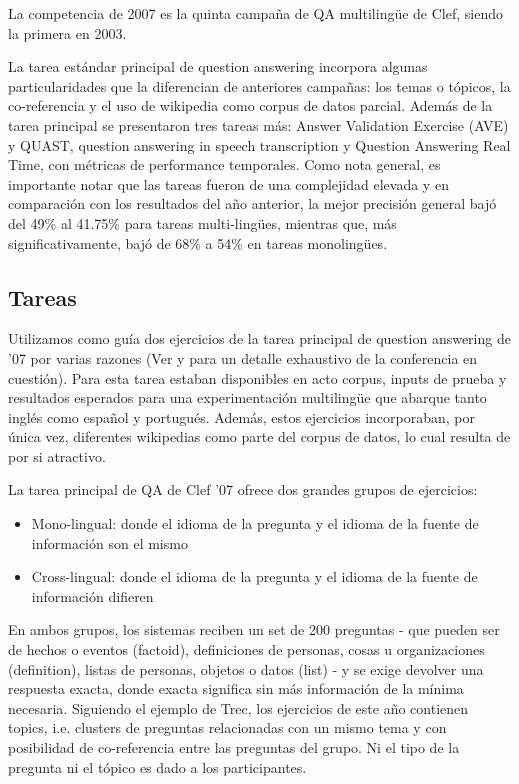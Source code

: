 La competencia de 2007 es la quinta campaña de QA multilingüe de Clef, siendo la primera en 2003.

La tarea estándar principal de question answering incorpora algunas particularidades que la diferencian de anteriores campañas: los temas o tópicos, la co-referencia y el uso de wikipedia como corpus de datos parcial. Además de la tarea principal se presentaron tres tareas más: Answer Validation Exercise (AVE) y QUAST, question answering in speech transcription y Question Answering Real Time, con métricas de performance temporales. Como nota general, es importante notar que las tareas fueron de una complejidad elevada y en comparación con los resultados del año anterior, la mejor precisión general bajó del 49\% al 41.75\% para tareas multi-lingües, mientras que, más significativamente, bajó de 68\% a 54\% en tareas monolingües.


\subsection{Tareas}
\label{subsec:tareas}
Utilizamos como guía dos ejercicios de la tarea principal de question answering de '07  por varias razones (Ver \cite{GuidelineClef07} y \cite{OverviewClef07} para un detalle exhaustivo de la conferencia en cuestión). Para esta tarea estaban disponibles en acto corpus, inputs de prueba y resultados esperados para una experimentación multilingüe que abarque tanto inglés como español y portugués. Además, estos ejercicios incorporaban, por única vez, diferentes wikipedias como parte del corpus de datos, lo cual resulta de por si atractivo.

La tarea principal de QA de Clef '07 ofrece dos grandes grupos de ejercicios:
\begin{itemize}
\item Mono-lingual: donde el idioma de la pregunta y el idioma de la fuente de información son el mismo
\item Cross-lingual: donde el idioma de la pregunta y el idioma de la fuente de información difieren
\end{itemize}

En ambos grupos, los sistemas reciben un set de 200 preguntas - que pueden ser de hechos o eventos (factoid), definiciones de personas, cosas u organizaciones (definition), listas de personas, objetos o datos (list) - y se exige devolver una respuesta exacta, donde exacta significa sin más información de la mínima necesaria. Siguiendo el ejemplo de Trec, los ejercicios de este año contienen topics, i.e. clusters de preguntas relacionadas con un mismo tema y con posibilidad de co-referencia entre las preguntas del grupo. Ni el tipo de la pregunta ni el tópico es dado a los participantes.

